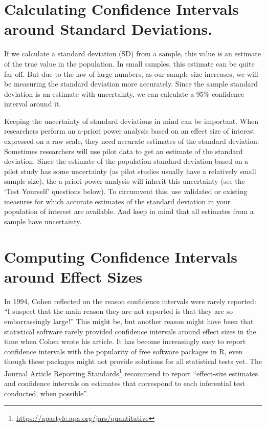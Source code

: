 \documentclass[
  oneside]{krantz}
\renewcommand{\href}[2]{#2\footnote{\url{#1}}}
\begin{document}
\hypertarget{calculating-confidence-intervals-around-standard-deviations.}{%
\section{Calculating Confidence Intervals around Standard Deviations.}\label{calculating-confidence-intervals-around-standard-deviations.}}

If we calculate a standard deviation (SD) from a sample, this value is an
estimate of the true value in the population. In small samples, this estimate can be quite far off. But due to the law of large numbers, as our sample size increases, we will be measuring the standard deviation more accurately. Since the sample standard deviation is an estimate with uncertainty, we can calculate a 95\% confidence interval around it.

Keeping the uncertainty of standard deviations in mind can be important. When researchers perform an a-priori power analysis based on an effect size of interest expressed on a raw scale, they need accurate estimates of the standard deviation. Sometimes researchers will use pilot data to get an estimate of the standard deviation. Since the estimate of the population standard deviation based on a pilot study has some uncertainty (as pilot studies usually have a relatively small sample size), the a-priori power analysis will inherit this uncertainty (see the `Test Yourself' questions below). To circumvent this, use validated or existing measures for which accurate estimates of the standard deviation in your population of interest are available. And keep in mind that all estimates from a sample have uncertainty.

\hypertarget{computing-confidence-intervals-around-effect-sizes}{%
\section{Computing Confidence Intervals around Effect Sizes}\label{computing-confidence-intervals-around-effect-sizes}}

In 1994, Cohen \citeyearpar{cohen_earth_1994} reflected on the reason confidence intervals were rarely reported: ``I suspect that the main reason they are not reported is that they are so embarrassingly large!'' This might be, but another reason might have been that statistical software rarely provided confidence intervals around effect sizes in the time when Cohen wrote his article. It has become increasingly easy to report confidence intervals with the popularity of free software packages in R, even though these packages might not provide solutions for all statistical tests yet. The \href{https://apastyle.apa.org/jars/quantitative}{Journal Article Reporting Standards} recommend to report ``effect-size estimates and confidence intervals on estimates that correspond to each inferential test conducted, when possible''.
\end{document}
